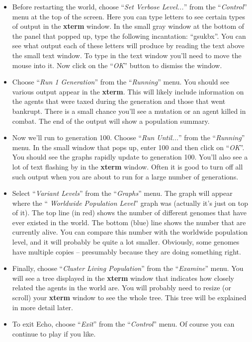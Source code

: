 \begin{itemize}
\item
Before restarting the world, choose ``{\sl Set Verbose Level...}''
from the ``{\sl Control}'' menu at the top of the
screen. Here you can type letters to see certain
types of output in the {\bf xterm} window.  In the small gray window
at the bottom of the panel that popped up, type the following
incantation: ``gsukbx''. You can see what output each of these letters
will produce by reading the text above the small text window. To type
in the text window you'll need to move the mouse into it. Now click on
the ``{\sl OK}'' button to dismiss the window.

\item
Choose ``{\sl Run 1 Generation}'' from the ``{\sl Running}''
menu. You should see various output appear in the
{\bf xterm}. This will likely include information on the agents that
were taxed during the generation and those that went bankrupt. There
is a small chance you'll see a mutation or an agent killed in
combat. The end of the output will show a population summary.

\item
Now we'll run to generation 100. Choose ``{\sl Run Until...}'' from
the ``{\sl Running}'' menu. In the small window
that pops up, enter 100 and then click on ``{\sl OK}''. You should see
the graphs rapidly update to generation 100. You'll also see a lot of
text flashing by in the {\bf xterm} window. Often it is good to turn
off all such output when you are about to run for a large number of
generations.

\item
Select ``{\sl Variant Levels}'' from the
``{\sl Graphs}'' menu. The graph will appear where the ``{\sl
Worldwide Population Level}'' graph was (actually it's just on top of
it). The top line (in red) shows the number of different genomes that
have ever existed in the world. The bottom (blue) line shows the
number that are currently alive. You can compare this number with the
worldwide population level, and it will probably be quite a lot
smaller. Obviously, some genomes have multiple copies -- presumably
because they are doing something right.

\item
Finally, choose ``{\sl Cluster Living Population}'' from the ``{\sl Examine}'' menu. You
will see a tree displayed in the {\bf xterm} window that indicates how
closely related the agents in the world are.  You will probably need
to resize (or scroll) your {\bf xterm} window to see the whole
tree. This tree will be explained in more detail later.

\item
To exit Echo, choose ``{\sl Exit}'' from the
``{\sl Control}'' menu.  Of course you can continue to play if you
like.

\end{itemize}

